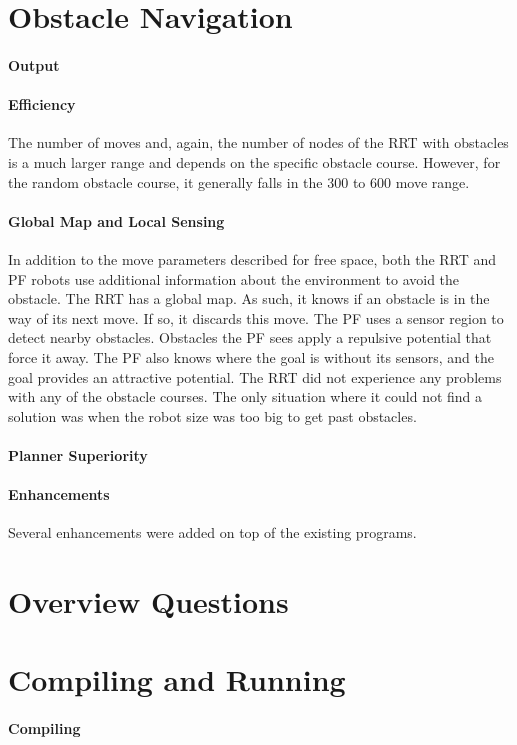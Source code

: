 \documentclass[12pt]{article}
\begin{document}
\section{Obstacle Navigation}
\paragraph*{Output}
\paragraph*{Efficiency}
The number of moves and, again, the number of nodes of the RRT with obstacles is a much larger range and depends on the specific obstacle course. However, for the random obstacle course, it generally falls in the 300 to 600 move range.
\paragraph*{Global Map and Local Sensing}
In addition to the move parameters described for free space, both the RRT and PF robots use additional information about the environment to avoid the obstacle. The RRT has a global map. As such, it knows if an obstacle is in the way of its next move. If so, it discards this move. The PF uses a sensor region to detect nearby obstacles. Obstacles the PF sees apply a repulsive potential that force it away. The PF also knows where the goal is without its sensors, and the goal provides an attractive potential. The RRT did not experience any problems with any of the obstacle courses. The only situation where it could not find a solution was when the robot size was too big to get past obstacles. 
\paragraph*{Planner Superiority}
\paragraph*{Enhancements}
Several enhancements were added on top of the existing programs. 
\section{Overview Questions}

\section{Compiling and Running}
\paragraph*{Compiling}
\begin{verbatim}
\end{verbatim}
\end{document}
